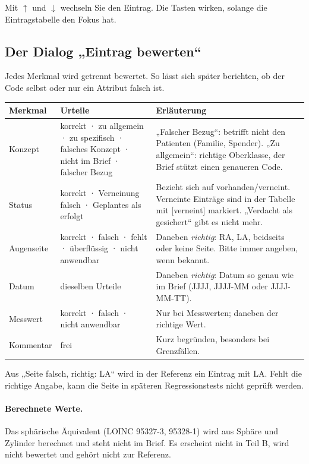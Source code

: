 \documentclass[11pt,a4paper,parskip=half-,headings=standardclasses,toc=bibliography,open=any]{scrreprt}
\newcommand{\feld}[1]{\textsf{\itshape #1}}
\begin{document}
Mit $\uparrow$ und $\downarrow$ wechseln Sie den Eintrag. Die Tasten wirken, solange die Eintragstabelle den Fokus hat.

\subsection*{Der Dialog „Eintrag bewerten“}

Jedes Merkmal wird getrennt bewertet. So lässt sich später berichten, ob der Code selbst oder nur ein Attribut falsch ist.

\begin{tabularx}{\textwidth}{@{}P{2.6cm}P{5.0cm}L@{}}
\toprule
\textbf{Merkmal} & \textbf{Urteile} & \textbf{Erläuterung}\\
\midrule
Konzept & korrekt · zu allgemein · zu spezifisch · falsches Konzept · nicht im Brief · falscher Bezug & „Falscher Bezug“: betrifft nicht den Patienten (Familie, Spender). „Zu allgemein“: richtige Oberklasse, der Brief stützt einen genaueren Code.\\
Status & korrekt · Verneinung falsch · Geplantes als erfolgt & Bezieht sich auf vorhanden/verneint. Verneinte Einträge sind in der Tabelle mit \textsf{[verneint]} markiert. „Verdacht als gesichert“ gibt es nicht mehr.\\
Augenseite & korrekt · falsch · fehlt · überflüssig · nicht anwendbar & Daneben \feld{richtig}: RA, LA, beidseits oder keine Seite. Bitte immer angeben, wenn bekannt.\\
Datum & dieselben Urteile & Daneben \feld{richtig}: Datum so genau wie im Brief (JJJJ, JJJJ-MM oder JJJJ-MM-TT).\\
Messwert & korrekt · falsch · nicht anwendbar & Nur bei Messwerten; daneben der richtige Wert.\\
Kommentar & frei & Kurz begründen, besonders bei Grenzfällen.\\
\bottomrule
\end{tabularx}

\begin{hinweis}
Aus „Seite falsch, richtig: LA“ wird in der Referenz ein Eintrag mit LA. Fehlt die richtige Angabe, kann die Seite in späteren Regressionstests nicht geprüft werden.
\end{hinweis}

\paragraph{Berechnete Werte.} Das sphärische Äquivalent (LOINC 95327-3, 95328-1) wird aus Sphäre und Zylinder berechnet und steht nicht im Brief. Es erscheint nicht in Teil B, wird nicht bewertet und gehört nicht zur Referenz.
\end{document}
